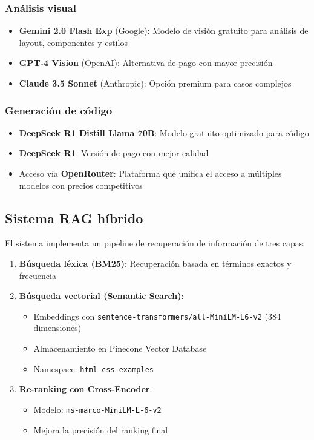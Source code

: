 \documentclass[12pt,a4paper]{article}
\begin{document}
\subsubsection{Análisis visual}
\begin{itemize}
    \item \textbf{Gemini 2.0 Flash Exp} (Google): Modelo de visión gratuito para análisis de layout, componentes y estilos
    \item \textbf{GPT-4 Vision} (OpenAI): Alternativa de pago con mayor precisión
    \item \textbf{Claude 3.5 Sonnet} (Anthropic): Opción premium para casos complejos
\end{itemize}

\subsubsection{Generación de código}
\begin{itemize}
    \item \textbf{DeepSeek R1 Distill Llama 70B}: Modelo gratuito optimizado para código
    \item \textbf{DeepSeek R1}: Versión de pago con mejor calidad
    \item Acceso vía \textbf{OpenRouter}: Plataforma que unifica el acceso a múltiples modelos con precios competitivos
\end{itemize}

\subsection{Sistema RAG híbrido}

El sistema implementa un pipeline de recuperación de información de tres capas:

\begin{enumerate}
    \item \textbf{Búsqueda léxica (BM25)}: Recuperación basada en términos exactos y frecuencia
    \item \textbf{Búsqueda vectorial (Semantic Search)}: 
    \begin{itemize}
        \item Embeddings con \texttt{sentence-transformers/all-MiniLM-L6-v2} (384 dimensiones)
        \item Almacenamiento en Pinecone Vector Database
        \item Namespace: \texttt{html-css-examples}
    \end{itemize}
    \item \textbf{Re-ranking con Cross-Encoder}:
    \begin{itemize}
        \item Modelo: \texttt{ms-marco-MiniLM-L-6-v2}
        \item Mejora la precisión del ranking final
    \end{itemize}
\end{enumerate}
\end{document}
